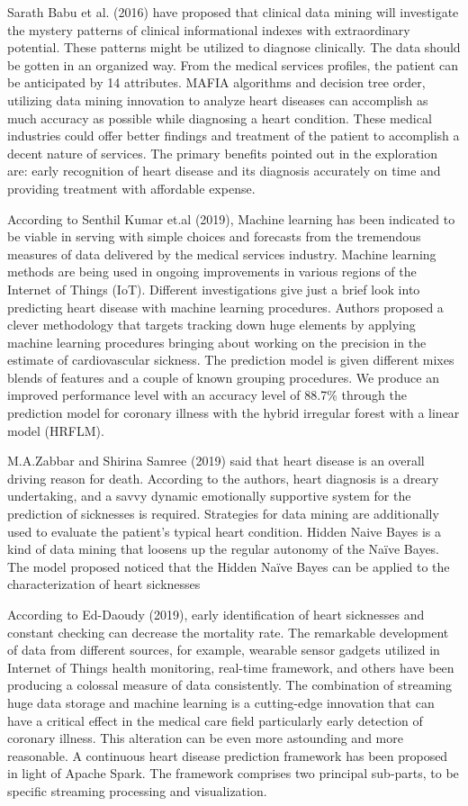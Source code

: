 Sarath Babu et al. (2016) have proposed that clinical data mining will investigate the mystery patterns of clinical informational indexes with extraordinary potential. These patterns might be utilized to diagnose clinically. The data should be gotten in an organized way. From the medical services profiles, the patient can be anticipated by 14 attributes. MAFIA algorithms and decision tree order, utilizing data mining innovation to analyze heart diseases can accomplish as much accuracy as possible while diagnosing a heart condition. These medical industries could offer better findings and treatment of the patient to accomplish a decent nature of services. The primary benefits pointed out in the exploration are: early recognition of heart disease and its diagnosis accurately on time and providing treatment with affordable expense.

According to Senthil Kumar et.al (2019), Machine learning has been indicated to be viable in serving with simple choices and forecasts from the tremendous measures of data delivered by the medical services industry. Machine learning methods are being used in ongoing improvements in various regions of the Internet of Things (IoT). Different investigations give just a brief look into predicting heart disease with machine learning procedures. Authors proposed a clever methodology that targets tracking down huge elements by applying machine learning procedures bringing about working on the precision in the estimate of cardiovascular sickness. The prediction model is given different mixes blends of features and a couple of known grouping procedures. We produce an improved performance level with an accuracy level of 88.7\% through the prediction model for coronary illness with the hybrid irregular forest with a linear model (HRFLM).

M.A.Zabbar and Shirina Samree (2019) said that heart disease is an overall driving reason for death. According to the authors, heart diagnosis is a dreary undertaking, and a savvy dynamic emotionally supportive system for the prediction of sicknesses is required. Strategies for data mining are additionally used to evaluate the patient's typical heart condition. Hidden Naive Bayes is a kind of data mining that loosens up the regular autonomy of the Naïve Bayes. The model proposed noticed that the Hidden Naïve Bayes can be applied to the characterization of heart sicknesses

According to Ed-Daoudy (2019), early identification of heart sicknesses and constant checking can decrease the mortality rate. The remarkable development of data from different sources, for example, wearable sensor gadgets utilized in Internet of Things health monitoring, real-time framework, and others have been producing a colossal measure of data consistently. The combination of streaming huge data storage and machine learning is a cutting-edge innovation that can have a critical effect in the medical care field particularly early detection of coronary illness. This alteration can be even more astounding and more reasonable. A continuous heart disease prediction framework has been proposed in light of Apache Spark. The framework comprises two principal sub-parts, to be specific streaming processing and visualization.

